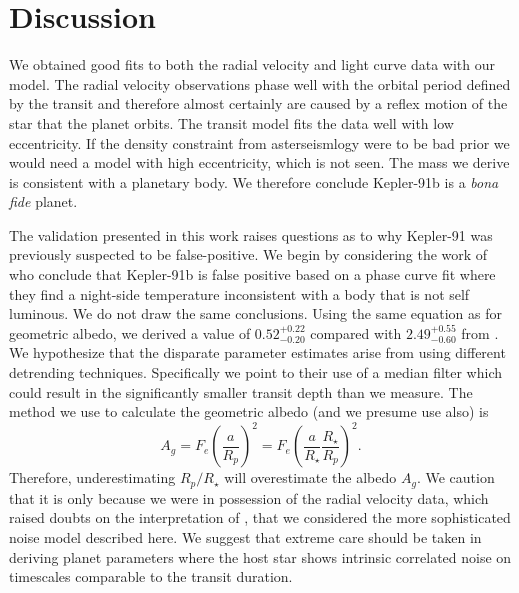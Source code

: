 \documentclass[apjl]{emulateapj}
\begin{document}
\section{Discussion}
We obtained good fits to both the radial velocity and light curve data with our model. The radial velocity observations phase well with the orbital period defined by the transit and therefore almost certainly are caused by a reflex motion of the star that the planet orbits. The transit model fits the data well with low eccentricity. If the density constraint from asterseismlogy were to be bad prior we would need a model with high eccentricity, which is not seen. The mass we derive is consistent with a planetary body. We therefore conclude Kepler-91b is a \emph{bona fide} planet.

The validation presented in this work raises questions as to why Kepler-91 was previously suspected to be false-positive. We begin by considering the work of \citet{esteves13} who conclude that Kepler-91b is false positive based on a phase curve fit where they find a night-side temperature inconsistent with a body that is not self luminous. We do not draw the same conclusions. Using the same equation as \citeauthor{esteves13} for geometric albedo, we derived a value of $0.52^{+0.22}_{-0.20}$ compared with $2.49^{+0.55}_{-0.60}$ from \citeauthor{esteves13}. We hypothesize that the disparate parameter estimates arise from using different detrending techniques. Specifically we point to their use of a median filter which could result in the significantly smaller transit depth than we measure. The method we use to calculate the geometric albedo (and we presume \citeauthor{esteves13} use also) is
\begin{equation}
A_g = F_e \left(\frac{a}{R_p}\right)^{2} = F_e \left(\frac{a}{R_{\star}}\frac{R_{\star}}{R_{p}}\right)^{2} .
\end{equation}
Therefore, underestimating $R_{p}/R_{\star}$ will overestimate the albedo $A_g$. We caution that it is only because we were in possession of the radial velocity data, which raised doubts on the interpretation of \citeauthor{esteves13}, that we considered the more sophisticated noise model described here. We suggest that extreme care should be taken in deriving planet parameters where the host star shows intrinsic correlated noise on timescales comparable to the transit duration.
\end{document}
